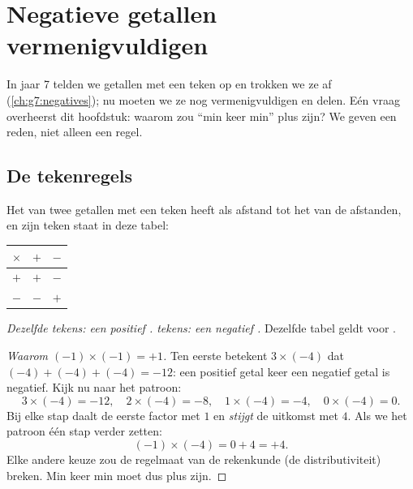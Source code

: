 \chapter{Negatieve getallen vermenigvuldigen}\label{ch:g8:negprod}

In jaar 7 telden we getallen met een teken op en trokken we ze af
(\cref{ch:g7:negatives}); nu moeten we ze nog vermenigvuldigen en delen. Eén vraag
overheerst dit hoofdstuk: waarom zou ``min keer min'' plus zijn? We geven een reden,
niet alleen een regel.

\section{De tekenregels}

\begin{theorem}\label{thm:g8:negprod:rules}
Het  van twee getallen met een teken heeft als afstand tot  het  van
de afstanden, en zijn teken staat in deze tabel:
\begin{center}
\renewcommand{\arraystretch}{1.3}
\begin{tabular}{c|cc}
$\times$ & $+$ & $-$ \\
\hline
$+$ & $+$ & $-$ \\
$-$ & $-$ & $+$ \\
\end{tabular}
\end{center}
\emph{Dezelfde tekens: een positief .  tekens: een negatief
.} Dezelfde tabel geldt voor .
\end{theorem}

\begin{proof}[Waarom $(-1) \times (-1) = +1$]
Ten eerste betekent $3 \times (-4)$ dat $(-4) + (-4) + (-4) = -12$: een positief
getal keer een negatief getal is negatief. Kijk nu naar het patroon:
\[
3 \times (-4) = -12, \quad
2 \times (-4) = -8, \quad
1 \times (-4) = -4, \quad
0 \times (-4) = 0 .
\]
Bij elke stap daalt de eerste factor met $1$ en \emph{stijgt} de uitkomst met $4$. Als
we het patroon één stap verder zetten:
\[
(-1) \times (-4) = 0 + 4 = +4 .
\]
Elke andere keuze zou de regelmaat van de rekenkunde (de distributiviteit) breken.
Min keer min moet dus plus zijn.
\end{proof}

